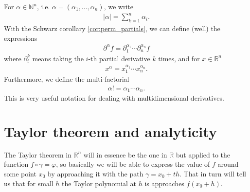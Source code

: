 \begin{definition}\label{def:multiindnotation}
    For $\alpha \in \mathbb{N}^{n}$, i.e. $\alpha = (\alpha_{1}, \dots, \alpha_{n})$, we write
    \begin{align*}
        \left| \alpha \right| = \sum_{k=1}^{n} \alpha_{i}.
    \end{align*}
    With the Schwarz corollary \ref{cor:perm_partials}, we can define (well) the expressions
    \begin{align*}
        \partial^{\alpha }f = \partial_{1}^{\alpha_{1}} \cdots \partial_{n}^{\alpha_{n}} f
    \end{align*}
    where $\partial_{i}^{k}$ means taking the $i$-th partial derivative $k$ times, and for $x \in \mathbb{R}^{n}$
    \begin{align*}
        x^{\alpha } = x_{1}^{\alpha_{1}} \cdots x_{n}^{\alpha_{n}}. 
    \end{align*}
    Furthermore, we define the multi-factorial
    \begin{align*}
        \alpha ! = \alpha_{1} \cdots \alpha_{n}.
    \end{align*}
    This is very useful notation for dealing with multidimensional derivatives.
\end{definition}

\section{Taylor theorem and analyticity}

The Taylor theorem in $\mathbb{R}^{n}$ will in essence be the one in $\mathbb{R}$ but applied to the function $f \circ \gamma = \varphi$, so basically we will be able to express the value of $f$ around some point $x_{0}$ by approaching it with the path $\gamma = x_{0} + th$. That in turn will tell us that for small $h$ the Taylor polynomial at $h$ is approaches $f(x_{0}+h)$. 

